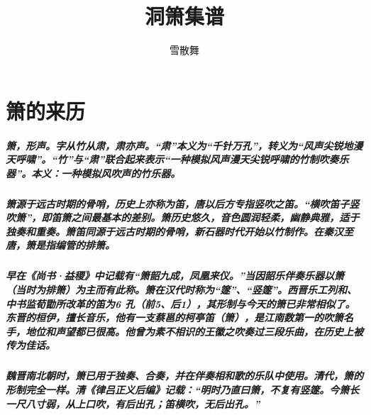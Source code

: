\documentclass[cn,pad,chinese]{elegantbook}
\title{洞箫集谱}
\author{雪散舞}
\date{\zhtoday}
\begin{document}
\maketitle
\frontmatter
\tableofcontents
\mainmatter

\chapter{箫的来历}
\paragraph*{箫，形声。字从竹从肃，肃亦声。“肃”本义为“千针万孔”，转义为“风声尖锐地漫天呼啸”。“竹”与“肃”联合起来表示“一种模拟风声漫天尖锐呼啸的竹制吹奏乐器”。本义：一种模拟风吹声的竹乐器。}
\paragraph*{箫源于远古时期的骨哨，历史上亦称为笛，唐以后方专指竖吹之笛。“横吹笛子竖吹箫”，即笛箫之间最基本的差别。箫历史悠久，音色圆润轻柔，幽静典雅，适于独奏和重奏。箫笛同源于远古时期的骨哨，新石器时代开始以竹制作。在秦汉至唐，箫是指编管的排箫。} 
\paragraph*{早在《尚书·益稷》中记载有“箫韶九成，凤凰来仪。”当因韶乐伴奏乐器以箫（当时为排箫）为主而有此称。箫在汉代时称为“篴”、“竖篴”。西晋乐工列和、中书监荀勖所改革的笛为6 孔（前5、后1），其形制与今天的箫已非常相似了。东晋的桓伊，擅长音乐，他有一支蔡邕的柯亭笛（箫），是江南数第一的吹箫名手，地位和声望都已很高。他曾为素不相识的王徽之吹奏过三段乐曲，在历史上被传为佳话。}
\paragraph*{魏晋南北朝时，箫已用于独奏、合奏，并在伴奏相和歌的乐队中使用。清代，箫的形制完全一样。清《律吕正义后编》记载：“明时乃直曰箫，不复有竖篴。今箫长一尺八寸弱，从上口吹，有后出孔；笛横吹，无后出孔。”}
\end{document}
